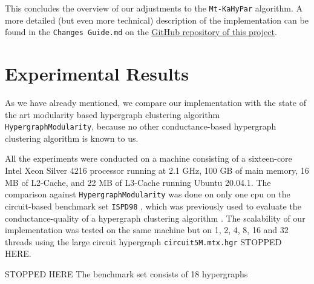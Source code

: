 \documentclass[acmsmall,nonacm,screen,review]{acmart}
\begin{document}
\medskip
This concludes the overview of our adjustments to the \texttt{Mt-KaHyPar} algorithm.
A more detailed (but even more technical) description of the implementation can be 
found in the \texttt{Changes Guide.md} on the
\hyperlink{https://github.com/mme-stud/iap_mt_kahypar}{GitHub repository of this project}.

\section{Experimental Results}
\label{sec:experiments}

As we have already mentioned, we compare our implementation with the state of the art
modularity based hypergraph clustering algorithm \texttt{HypergraphModularity}, 
because no other conductance-based hypergraph clustering algorithm is known to us.

All the experiments were conducted on a machine consisting of a sixteen-core Intel 
Xeon Silver 4216 processor running at 2.1 GHz, 100 GB of main memory, 
16 MB of L2-Cache, and 22 MB of L3-Cache running Ubuntu 20.04.1. The comparison 
against \texttt{HypergraphModularity} was done on only one cpu on the circuit-based 
benchmark set \texttt{ISPD98} \cite{IBMBenchmark}, which was previously used to 
evaluate the conductance-quality of a hypergraph clustering algorithm \cite{HyperSF}.
The scalability of our implementation was tested on the same machine but on 1, 2, 4, 8, 
16 and 32 threads using the large circuit hypergraph \texttt{circuit5M.mtx.hgr}
STOPPED HERE.


STOPPED HERE
The benchmark set consists of 18 hypergraphs
\end{document}
